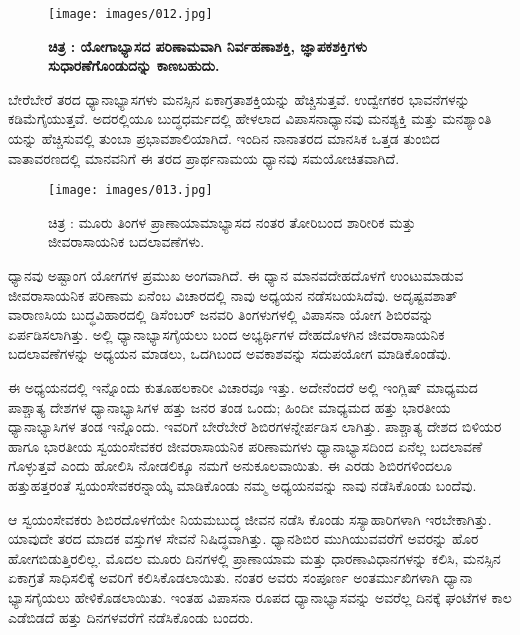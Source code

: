 \begin{figure}
\texttt{[image: images/012.jpg]}
\caption{ \textbf{ಚಿತ್ರ : ಯೋಗಾಭ್ಯಾಸದ ಪರಿಣಾಮವಾಗಿ ನಿರ್ವಹಣಾಶಕ್ತಿ, ಜ್ಞಾಪಕಶಕ್ತಿಗಳು ಸುಧಾರಣೆಗೊಂಡುದನ್ನು ಕಾಣಬಹುದು.} }
\end{figure}

ಬೇರೆಬೇರೆ ತರದ ಧ್ಯಾನಾಭ್ಯಾಸಗಳು ಮನಸ್ಸಿನ ಏಕಾಗ್ರತಾಶಕ್ತಿಯನ್ನು ಹೆಚ್ಚಿಸುತ್ತವೆ. ಉದ್ವೇಗಕರ ಭಾವನೆಗಳನ್ನು ಕಡಿಮೆಗೈಯುತ್ತವೆ. ಅದರಲ್ಲಿಯೂ ಬುದ್ಧಧರ್ಮದಲ್ಲಿ ಹೇಳಲಾದ ವಿಪಾಸನಾಧ್ಯಾನವು ಮನಶ್ಯಕ್ತಿ ಮತ್ತು ಮನಶ್ಯಾಂತಿ ಯನ್ನು ಹೆಚ್ಚಿಸುವಲ್ಲಿ ತುಂಬಾ ಪ್ರಭಾವಶಾಲಿಯಾಗಿದೆ. ಇಂದಿನ ನಾನಾತರದ ಮಾನಸಿಕ ಒತ್ತಡ ತುಂಬಿದ ವಾತಾವರಣದಲ್ಲಿ ಮಾನವನಿಗೆ ಈ ತರದ ಪ್ರಾರ್ಥನಾಮಯ ಧ್ಯಾನವು ಸಮಯೋಚಿತವಾಗಿದೆ.

\begin{center}
\end{center}


\begin{figure}
\texttt{[image: images/013.jpg]}
\caption{ಚಿತ್ರ : ಮೂರು ತಿಂಗಳ ಪ್ರಾಣಾಯಾಮಾಭ್ಯಾಸದ ನಂತರ ತೋರಿಬಂದ ಶಾರೀರಿಕ ಮತ್ತು ಜೀವರಾಸಾಯನಿಕ ಬದಲಾವಣೆಗಳು.}
\end{figure}

ಧ್ಯಾನವು ಅಷ್ಟಾಂಗ ಯೋಗಗಳ ಪ್ರಮುಖ ಅಂಗವಾಗಿದೆ. ಈ ಧ್ಯಾನ ಮಾನವದೇಹದೊಳಗೆ ಉಂಟುಮಾಡುವ ಜೀವರಾಸಾಯನಿಕ ಪರಿಣಾಮ ಏನೆಂಬ ವಿಚಾರದಲ್ಲಿ ನಾವು ಅಧ್ಯಯನ ನಡೆಸಬಯಸಿದೆವು. ಅದೃಷ್ಟವಶಾತ್ ವಾರಾಣಸಿಯ ಬುದ್ಧವಿಹಾರದಲ್ಲಿ  ಡಿಸೆಂಬರ್  ಜನವರಿ ತಿಂಗಳುಗಳಲ್ಲಿ ವಿಪಾಸನಾ ಯೋಗ ಶಿಬಿರವನ್ನು ಏರ್ಪಡಿಸಲಾಗಿತ್ತು. ಅಲ್ಲಿ ಧ್ಯಾನಾಭ್ಯಾಸಗೈಯಲು ಬಂದ ಅಭ್ಯರ್ಥಿಗಳ ದೇಹದೊಳಗಿನ ಜೀವರಾಸಾಯನಿಕ ಬದಲಾವಣೆಗಳನ್ನು ಅಧ್ಯಯನ ಮಾಡಲು, ಒದಗಿಬಂದ ಅವಕಾಶವನ್ನು ಸದುಪಯೋಗ ಮಾಡಿಕೊಂಡೆವು.

ಈ ಅಧ್ಯಯನದಲ್ಲಿ ಇನ್ನೊಂದು ಕುತೂಹಲಕಾರೀ ವಿಚಾರವೂ ಇತ್ತು. ಅದೇನೆಂದರೆ ಅಲ್ಲಿ ಇಂಗ್ಲಿಷ್ ಮಾಧ್ಯಮದ ಪಾಶ್ಚಾತ್ಯ ದೇಶಗಳ ಧ್ಯಾನಾಭ್ಯಾಸಿಗಳ ಹತ್ತು ಜನರ ತಂಡ ಒಂದು; ಹಿಂದೀ ಮಾಧ್ಯಮದ ಹತ್ತು ಭಾರತೀಯ ಧ್ಯಾನಾಭ್ಯಾಸಿಗಳ ತಂಡ ಇನ್ನೊಂದು. ಇವರಿಗೆ ಬೇರೆಬೇರೆ ಶಿಬಿರಗಳನ್ನೇರ್ಪಡಿಸ ಲಾಗಿತ್ತು. ಪಾಶ್ಚಾತ್ಯ ದೇಶದ ಬಿಳಿಯರ ಹಾಗೂ ಭಾರತೀಯ ಸ್ವಯಂಸೇವಕರ ಜೀವರಾಸಾಯನಿಕ ಪರಿಣಾಮಗಳು ಧ್ಯಾನಾಭ್ಯಾಸದಿಂದ ಏನೆಲ್ಲ ಬದಲಾವಣೆ ಗೊಳ್ಳುತ್ತವೆ ಎಂದು ಹೋಲಿಸಿ ನೋಡಲಿಕ್ಕೂ ನಮಗೆ ಅನುಕೂಲವಾಯಿತು. ಈ ಎರಡು ಶಿಬಿರಗಳಿಂದಲೂ ಹತ್ತುಹತ್ತರಂತೆ ಸ್ವಯಂಸೇವಕರನ್ನಾಯ್ಕೆ ಮಾಡಿಕೊಂಡು ನಮ್ಮ ಅಧ್ಯಯನವನ್ನು ನಾವು ನಡೆಸಿಕೊಂಡು ಬಂದೆವು.

ಆ ಸ್ವಯಂಸೇವಕರು ಶಿಬಿರದೊಳಗೆಯೇ ನಿಯಮಬುದ್ಧ ಜೀವನ ನಡೆಸಿ ಕೊಂಡು ಸಸ್ಯಾಹಾರಿಗಳಾಗಿ ಇರಬೇಕಾಗಿತ್ತು. ಯಾವುದೇ ತರದ ಮಾದಕ ವಸ್ತುಗಳ ಸೇವನೆ ನಿಷಿದ್ಧವಾಗಿತ್ತು. ಧ್ಯಾನಶಿಬಿರ ಮುಗಿಯುವವರೆಗೆ ಅವರನ್ನು ಹೊರ ಹೋಗಬಿಡುತ್ತಿರಲಿಲ್ಲ. ಮೊದಲ ಮೂರು ದಿನಗಳಲ್ಲಿ ಪ್ರಾಣಾಯಾಮ ಮತ್ತು ಧಾರಣಾವಿಧಾನಗಳನ್ನು ಕಲಿಸಿ, ಮನಸ್ಸಿನ ಏಕಾಗ್ರತೆ ಸಾಧಿಸಲಿಕ್ಕೆ ಅವರಿಗೆ ಕಲಿಸಿಕೊಡಲಾಯಿತು. ನಂತರ ಅವರು ಸಂಪೂರ್ಣ ಅಂತರ್ಮುಖಿಗಳಾಗಿ ಧ್ಯಾನಾ ಭ್ಯಾಸಗೈಯಲು ಹೇಳಿಕೊಡಲಾಯಿತು. ಇಂತಹ ವಿಪಾಸನಾ ರೂಪದ ಧ್ಯಾನಾಭ್ಯಾಸವನ್ನು ಅವರೆಲ್ಲ ದಿನಕ್ಕೆ  ಘಂಟೆಗಳ ಕಾಲ ಎಡೆಬಿಡದೆ ಹತ್ತು ದಿನಗಳವರೆಗೆ ನಡೆಸಿಕೊಂಡು ಬಂದರು.

